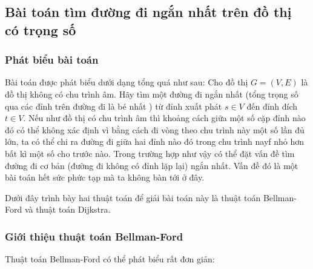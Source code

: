 \documentclass[a4paper,10pt]{article}
\begin{document}
\subsection{Bài toán tìm đường đi ngắn nhất trên đồ thị có trọng số}
\subsubsection{Phát biểu bài toán}
Bài toán được phát biểu dưới dạng tổng quá như sau: Cho đồ thị $G = (V, E)$ là đồ thị không có chu trình âm. Hãy tìm một đường đi ngắn nhất (tổng trọng số qua các đỉnh trên đường đi là bé nhất ) từ đỉnh xuất phát $s \in V$ đến đỉnh  đích $t \in V$. Nếu như đồ thị có chu trình âm thì khoảng cách giữa một số cặp đỉnh nào đó có thể không xác định vì bằng cách đi vòng theo chu trình này một số lần đủ lớn, ta có thể chi ra đường đi giữa hai đỉnh nào đó trong chu trình nayf nhỏ hơn bất kì một số cho trước nào. Trong trường hợp như vậy có thể đặt vấn đề tìm đường đi cơ bản (đường đi không có đỉnh lặp lại) ngắn nhất. Vấn đề đó là một bài toán hết sức phức tạp mà ta không bàn tới ở đây.

Dưới đây trình bày hai thuật toán để giải bài toán này là thuật toán Bellman-Ford và thuật toán Dijkstra.

\subsubsection{Giới thiệu thuật toán Bellman-Ford}
Thuật toán Bellman-Ford có thể phát biểu rất đơn giản:
\end{document}
